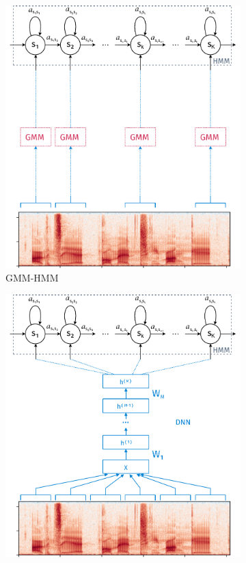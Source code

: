 \begin{figure}[htpb]
  \centering
  \begin{subfigure}[b]{0.4\textwidth}
    \includegraphics[width=\textwidth]{./ch4-experiments/img/gmm-hmm.pdf}
    \caption{GMM-HMM}
    \label{fig:experiments:normalization:hmm:gmm}
  \end{subfigure}
  \begin{subfigure}[b]{0.4\textwidth}
    \includegraphics[width=\textwidth]{./ch4-experiments/img/dnn-hmm.pdf}

\end{subfigure}
\end{figure}
